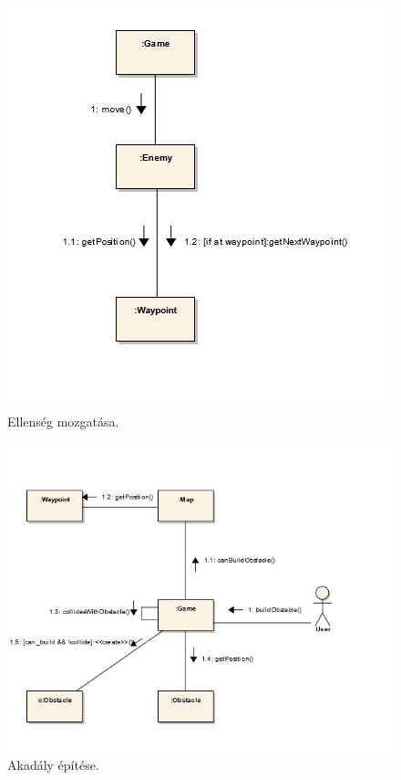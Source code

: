 \begin{figure}[H]
\begin{center}
\includegraphics{images/ch05/moveKomm.png}
\caption{Ellenség mozgatása.}
\label{fig:moveKomm}
\end{center}
\end{figure}

\begin{figure}[H]
\begin{center}
\includegraphics{images/ch05/buildObKomm.png}
\caption{Akadály építése.}
\label{fig:buildObKomm}
\end{center}
\end{figure}


